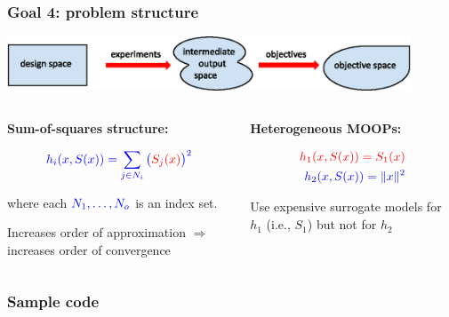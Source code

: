 \documentclass[aspectratio=169]{beamer}
\begin{document}
\begin{frame}\frametitle{Goal 4: problem structure}
\begin{center}
\includegraphics[width=0.9\textwidth]{obj-sim-des-space.eps}
\end{center}
\begin{columns}
\begin{column}{0.5\textwidth}
\textbf{Sum-of-squares structure:}

\medskip

{\large
$$
{\color{blue} h_i(x, S(x)) = \sum_{j \in N_i} \big({\color{red}S_j(x)}\big)^2}
$$

where each ${\color{blue} N_1, \ldots, N_o}$ is an index set.
}

\bigskip

Increases order of approximation $\Rightarrow$
increases order of convergence

\end{column}
\begin{column}{0.5\textwidth}
\textbf{Heterogeneous MOOPs:}

{\large
\begin{align*}
{\color{red} h_1(x, S(x)) = S_1(x)}\\
{\color{blue} h_2(x, S(x)) = \|x \|^2}
\end{align*}
}

Use expensive surrogate models for {\color{red} $h_1$} (i.e.,
{\color{red} $S_1$}) but not for {\color{blue} $h_2$}

\end{column}
\end{columns}
\end{frame}

\begin{frame}[fragile]\frametitle{Sample code}
  \lstset{style=python}
  
\end{frame}
\end{document}
